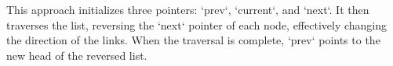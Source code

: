 \documentclass[preview]{standalone}
\begin{document}
This approach initializes three pointers: `prev`, `current`, and `next`. It then traverses the list, reversing the `next` pointer of each node, effectively changing the direction of the links. When the traversal is complete, `prev` points to the new head of the reversed list.\\
\end{document}
